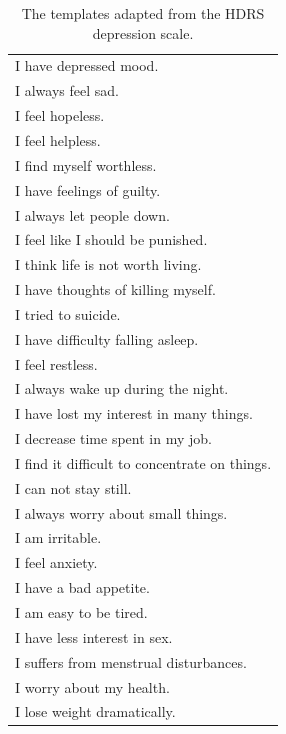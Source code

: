 \documentclass{article}
\begin{document}
\begin{table}
    \centering
    \small
    \begin{tabular}{l}
      \hline
      I have depressed mood. \\
      I always feel sad. \\
      I feel hopeless. \\
      I feel helpless. \\
      I find myself worthless. \\
      I have feelings of guilty. \\
      I always let people down. \\
      I feel like I should be punished. \\
      I think life is not worth living. \\
      I have thoughts of killing myself. \\
      I tried to suicide. \\
      I have difficulty falling asleep. \\
      I feel restless. \\
      I always wake up during the night. \\
      I have lost my interest in many things. \\
      I decrease time spent in my job. \\
      I find it difficult to concentrate on things. \\
      I can not stay still. \\
      I always worry about small things. \\
      I am irritable. \\
      I feel anxiety. \\
      I have a bad appetite. \\
      I am easy to be tired. \\
      I have less interest in sex. \\
      I suffers from menstrual disturbances. \\
      I worry about my health. \\
      I lose weight dramatically. \\
      \hline
    \end{tabular}
    \caption{The templates adapted from the HDRS depression scale. }
    \label{tab:Hamilton} 
  \end{table}
  
\end{document}
